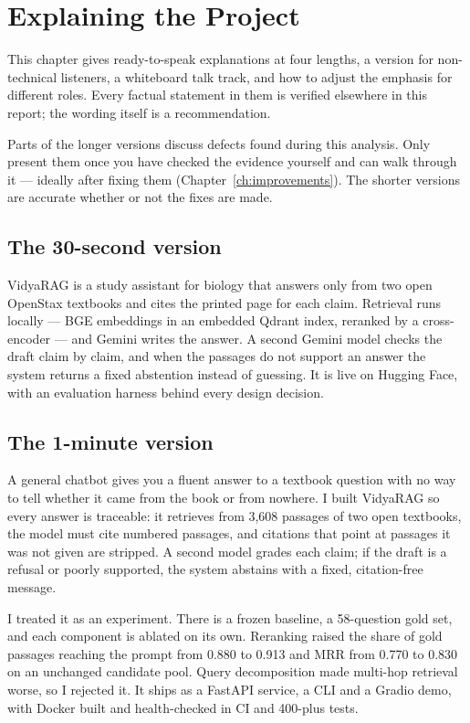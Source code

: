 \chapter{Explaining the Project}
\label{ch:explaining}

This chapter gives ready-to-speak explanations at four lengths, a version for non-technical listeners, a whiteboard talk track, and how to adjust the emphasis for different roles. Every factual statement in them is verified elsewhere in this report; the wording itself is a recommendation.

\begin{caution}
Parts of the longer versions discuss defects found during this analysis. Only present them once you have checked the evidence yourself and can walk through it --- ideally after fixing them (Chapter~\ref{ch:improvements}). The shorter versions are accurate whether or not the fixes are made.
\end{caution}

\section{The 30-second version}

\begin{keyidea}
VidyaRAG is a study assistant for biology that answers only from two open OpenStax textbooks and cites the printed page for each claim. Retrieval runs locally --- BGE embeddings in an embedded Qdrant index, reranked by a cross-encoder --- and Gemini writes the answer. A second Gemini model checks the draft claim by claim, and when the passages do not support an answer the system returns a fixed abstention instead of guessing. It is live on Hugging Face, with an evaluation harness behind every design decision.
\end{keyidea}

\section{The 1-minute version}

\begin{keyidea}
A general chatbot gives you a fluent answer to a textbook question with no way to tell whether it came from the book or from nowhere. I built VidyaRAG so every answer is traceable: it retrieves from 3,608 passages of two open textbooks, the model must cite numbered passages, and citations that point at passages it was not given are stripped. A second model grades each claim; if the draft is a refusal or poorly supported, the system abstains with a fixed, citation-free message.

I treated it as an experiment. There is a frozen baseline, a 58-question gold set, and each component is ablated on its own. Reranking raised the share of gold passages reaching the prompt from 0.880 to 0.913 and MRR from 0.770 to 0.830 on an unchanged candidate pool. Query decomposition made multi-hop retrieval worse, so I rejected it. It ships as a FastAPI service, a CLI and a Gradio demo, with Docker built and health-checked in CI and 400-plus tests.
\end{keyidea}

